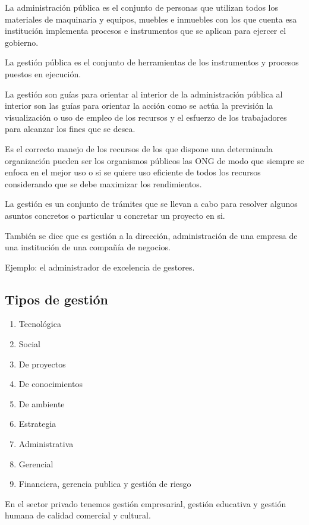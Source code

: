 \documentclass[
  jou,
  floatsintext,
  longtable,
  a4paper,
  nolmodern,
  notxfonts,
  notimes,
  12pt,
  colorlinks=true,linkcolor=blue,citecolor=blue,urlcolor=blue]{apa7}
\providecommand{\tightlist}{%
  \setlength{\itemsep}{0pt}\setlength{\parskip}{0pt}}
\begin{document}
La administración pública es el conjunto de personas que utilizan todos
los materiales de maquinaria y equipos, muebles e inmuebles con los que
cuenta esa institución implementa procesos e instrumentos que se aplican
para ejercer el gobierno.

La gestión pública es el conjunto de herramientas de los instrumentos y
procesos puestos en ejecución.

La gestión son guías para orientar al interior de la administración
pública al interior son las guías para orientar la acción como se actúa
la previsión la visualización o uso de empleo de los recursos y el
esfuerzo de los trabajadores para alcanzar los fines que se desea.

Es el correcto manejo de los recursos de los que dispone una determinada
organización pueden ser los organismos públicos las ONG de modo que
siempre se enfoca en el mejor uso o si se quiere uso eficiente de todos
los recursos considerando que se debe maximizar los rendimientos.

La gestión es un conjunto de trámites que se llevan a cabo para resolver
algunos asuntos concretos o particular u concretar un proyecto en si.

También se dice que es gestión a la dirección, administración de una
empresa de una institución de una compañía de negocios.

Ejemplo: el administrador de excelencia de gestores.

\subsection{Tipos de gestión}\label{tipos-de-gestiuxf3n}

\begin{enumerate}
\def\labelenumi{\arabic{enumi}.}
\tightlist
\item
  Tecnológica
\item
  Social
\item
  De proyectos
\item
  De conocimientos
\item
  De ambiente
\item
  Estrategia
\item
  Administrativa
\item
  Gerencial
\item
  Financiera, gerencia publica y gestión de riesgo
\end{enumerate}

En el sector privado tenemos gestión empresarial, gestión educativa y
gestión humana de calidad comercial y cultural.
\end{document}
